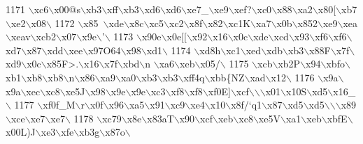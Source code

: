 \begin{DoxyCode}
1171 \textcolor{stringliteral}{\(\backslash\)xc6\(\backslash\)x00@s\(\backslash\)xb3\(\backslash\)xff\(\backslash\)xb3\(\backslash\)xd6\(\backslash\)xd6\(\backslash\)xe7\_\(\backslash\)xe9\(\backslash\)xef?\(\backslash\)xc0\(\backslash\)x88\(\backslash\)xa2\(\backslash\)x80[\(\backslash\)xb7\(\backslash\)xe2\(\backslash\)x08\(\backslash\)}
1172 \textcolor{stringliteral}{\(\backslash\)x85~\(\backslash\)xde\(\backslash\)x8c\(\backslash\)xc5\(\backslash\)xc2\(\backslash\)x8f\(\backslash\)x82\(\backslash\)xc1K\(\backslash\)xa7\(\backslash\)x0b\(\backslash\)x852\(\backslash\)xe9\(\backslash\)xea\(\backslash\)xeav\(\backslash\)xcb2\(\backslash\)x07\(\backslash\)x9e\(\backslash\)'\(\backslash\)}
1173 \textcolor{stringliteral}{\(\backslash\)x90e\(\backslash\)x0e[[\(\backslash\)x92\(\backslash\)x16\(\backslash\)x0c\(\backslash\)xde\(\backslash\)xcd\(\backslash\)x93\(\backslash\)xf6\(\backslash\)xf6\(\backslash\)xd7\(\backslash\)x87\(\backslash\)xdd\(\backslash\)xee\(\backslash\)x97O64\(\backslash\)x98\(\backslash\)xd1\(\backslash\)}
1174 \textcolor{stringliteral}{\(\backslash\)xd8h\(\backslash\)xc1\(\backslash\)xed\(\backslash\)xdb\(\backslash\)xb3\(\backslash\)x88F\(\backslash\)x7f\(\backslash\)xd9\(\backslash\)x0c\(\backslash\)x85F>.\(\backslash\)x16\(\backslash\)x7f\(\backslash\)xbd\(\backslash\)n \(\backslash\)xa6\(\backslash\)xeb\(\backslash\)x05/\(\backslash\)}
1175 \textcolor{stringliteral}{\(\backslash\)xcb\(\backslash\)xb2P\(\backslash\)x94\(\backslash\)xbfo\(\backslash\)xb1\(\backslash\)xb8\(\backslash\)xb8\(\backslash\)n\(\backslash\)x86\(\backslash\)xa9\(\backslash\)xa0\(\backslash\)xb3\(\backslash\)xb3\(\backslash\)xff4q\(\backslash\)xbb\{NZ\(\backslash\)xad\(\backslash\)x12\(\backslash\)}
1176 \textcolor{stringliteral}{\(\backslash\)x9a\(\backslash\)x9a\(\backslash\)xec\(\backslash\)xc8\(\backslash\)xe5J\(\backslash\)x98\(\backslash\)x9e\(\backslash\)x9e\(\backslash\)xc3\(\backslash\)xf8\(\backslash\)xf8\(\backslash\)xf0E]\(\backslash\)xcf\(\backslash\)\(\backslash\)\(\backslash\)x01\(\backslash\)x10S\(\backslash\)xd5\(\backslash\)x16\_ \(\backslash\)}
1177 \textcolor{stringliteral}{\(\backslash\)xf0f\_M\(\backslash\)r\(\backslash\)x0f\(\backslash\)x96\(\backslash\)xa5\(\backslash\)x91\(\backslash\)xc9\(\backslash\)xe4\(\backslash\)x10\(\backslash\)x8f/`q1\(\backslash\)x87\(\backslash\)xd5\(\backslash\)xd5\(\backslash\)\(\backslash\)\(\backslash\)x89\(\backslash\)xce\(\backslash\)xe7\(\backslash\)xe7\(\backslash\)}
1178 \textcolor{stringliteral}{\(\backslash\)xc79\(\backslash\)x8e\(\backslash\)x83aT\(\backslash\)x90\(\backslash\)xcf\(\backslash\)xeb\(\backslash\)xc8\(\backslash\)xe5V\(\backslash\)xa1\(\backslash\)xeb\(\backslash\)xbfE\(\backslash\)x00L)J\(\backslash\)xe3\(\backslash\)xfe\(\backslash\)xb3g\(\backslash\)x87o\(\backslash\)}

\end{DoxyCode}
